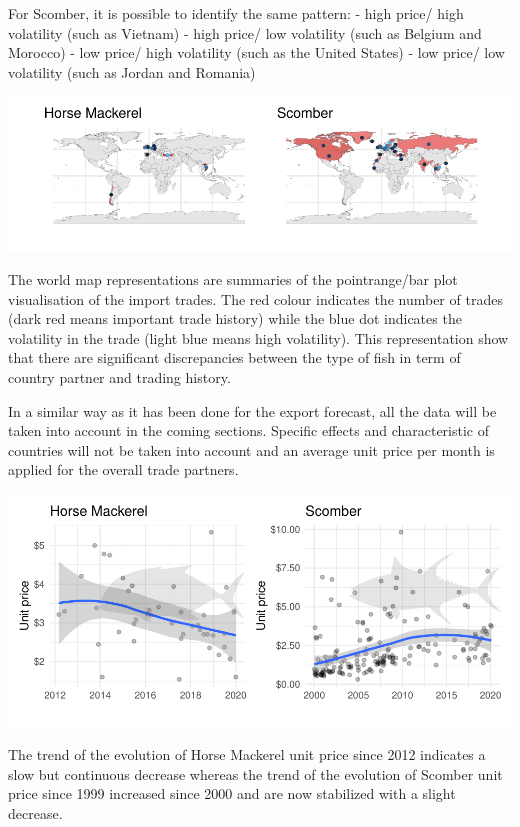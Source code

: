 \documentclass[10,a4paperpaper,]{article}
\begin{document}
For Scomber, it is possible to identify the same pattern: - high price/
high volatility (such as Vietnam) - high price/ low volatility (such as
Belgium and Morocco) - low price/ high volatility (such as the United
States) - low price/ low volatility (such as Jordan and Romania)

\includegraphics{report_files/figure-latex/unnamed-chunk-14-1.pdf}

The world map representations are summaries of the pointrange/bar plot
visualisation of the import trades. The red colour indicates the number
of trades (dark red means important trade history) while the blue dot
indicates the volatility in the trade (light blue means high
volatility). This representation show that there are significant
discrepancies between the type of fish in term of country partner and
trading history.

In a similar way as it has been done for the export forecast, all the
data will be taken into account in the coming sections. Specific effects
and characteristic of countries will not be taken into account and an
average unit price per month is applied for the overall trade partners.

\includegraphics{report_files/figure-latex/unnamed-chunk-15-1.pdf}

The trend of the evolution of Horse Mackerel unit price since 2012
indicates a slow but continuous decrease whereas the trend of the
evolution of Scomber unit price since 1999 increased since 2000 and are
now stabilized with a slight decrease.
\end{document}
